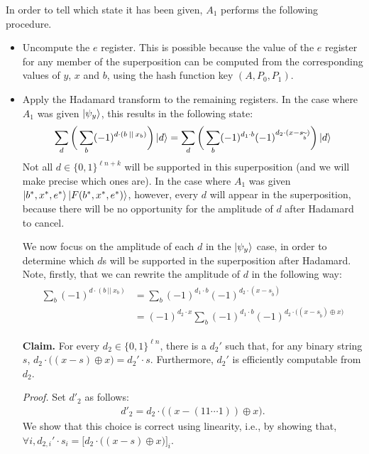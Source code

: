 \documentclass{article}
\begin{document}
In order to tell which state it has been given, $A_1$ performs the following procedure.
\begin{itemize}
    \item Uncompute the $e$ register. This is possible because the value of the $e$ register for any member of the superposition can be computed from the corresponding values of $y$, $x$ and $b$, using the hash function key $(A, P_0, P_1)$.
    \item Apply the Hadamard transform to the remaining registers. In the case where $A_1$ was given $\ket{\psi_y}$, this results in the following state:
    \begin{align}
        \sum_d \bigg( \sum_b (-1)^{d \cdot (b \: || \: x_b)} \bigg) \ket{d} = \sum_d \bigg( \sum_b (-1)^{d_1 \cdot b} (-1)^{d_2 \cdot (x - s_{\widetilde{b}})} \bigg) \ket{d}
    \end{align}
    Not all $d \in \{0,1\}^{\ell n + k}$ will be supported in this superposition (and we will make precise which ones are). In the case where $A_1$ was given $\ket{b^*, x^*, e^*} \ket{F(b^*, x^*, e^*)}$, however, every $d$ will appear in the superposition, because there will be no opportunity for the amplitude of $d$ after Hadamard to cancel.
    
    We now focus on the amplitude of each $d$ in the $\ket{\psi_y}$ case, in order to determine which $d$s will be supported in the superposition after Hadamard. Note, firstly, that we can rewrite the amplitude of $d$ in the following way:
    \begin{align}
    \begin{split}
        \sum_b (-1)^{d \cdot (b \: || \: x_b)} &= \sum_b (-1)^{d_1 \cdot b} (-1)^{d_2 \cdot (x - s_{\widetilde{b}})} \\
        &= (-1)^{d_2 \cdot x} \sum_b (-1)^{d_1 \cdot b} (-1)^{d_2 \cdot \big( (x - s_{\widetilde{b}}) \oplus x \big)}
    \end{split}
    \end{align}
    
    \textbf{Claim.} For every $d_2 \in \{0,1\}^{\ell n}$, there is a $d_2'$ such that, for any binary string $s$, $d_2 \cdot \big( (x - s) \oplus x \big) = d_2' \cdot s$. Furthermore, $d_2'$ is efficiently computable from $d_2$.
    
    \textit{Proof.} Set $d'_2$ as follows:
    \begin{align}
        d'_2 = d_2 \cdot \big( (x - (11 \cdots 1)) \oplus x \big).
    \end{align}
    We show that this choice is correct using linearity, i.e., by showing that, $\forall i, d_{2, i}' \cdot s_i = \big[ d_2 \cdot \big( (x - s) \oplus x \big) \big]_i$.
\end{itemize}
\end{document}
